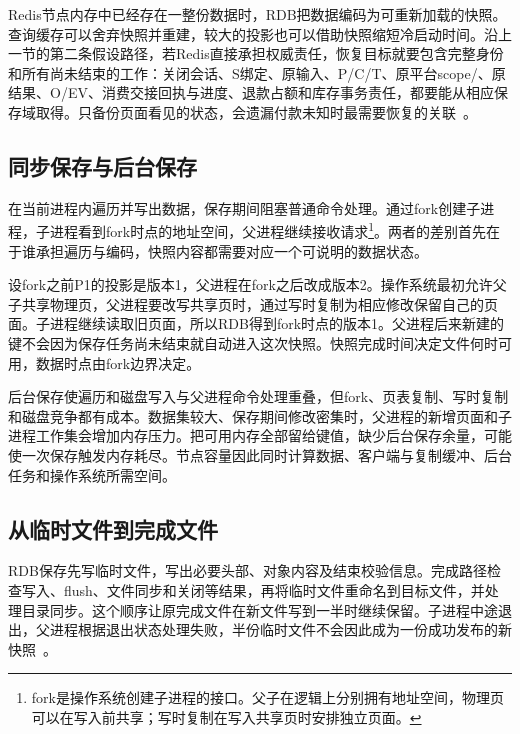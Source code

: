 Redis节点内存中已经存在一整份数据时，RDB把数据编码为可重新加载的快照。查询缓存可以舍弃快照并重建，较大的投影也可以借助快照缩短冷启动时间。沿上一节的第二条假设路径，若Redis直接承担权威责任，恢复目标就要包含完整身份和所有尚未结束的工作：关闭会话、S绑定、原输入、P/C/T、原平台scope/、原结果、O/EV、消费交接回执与进度、退款占额和库存事务责任，都要能从相应保存域取得。只备份页面看见的状态，会遗漏付款未知时最需要恢复的关联~\cite{redis8102-persistence}。

\subsection{同步保存与后台保存}

在当前进程内遍历并写出数据，保存期间阻塞普通命令处理。通过fork创建子进程，子进程看到fork时点的地址空间，父进程继续接收请求\footnote{fork是操作系统创建子进程的接口。父子在逻辑上分别拥有地址空间，物理页可以在写入前共享；写时复制在写入共享页时安排独立页面。}。两者的差别首先在于谁承担遍历与编码，快照内容都需要对应一个可说明的数据状态。

设fork之前P1的投影是版本1，父进程在fork之后改成版本2。操作系统最初允许父子共享物理页，父进程要改写共享页时，通过写时复制为相应修改保留自己的页面。子进程继续读取旧页面，所以RDB得到fork时点的版本1。父进程后来新建的键不会因为保存任务尚未结束就自动进入这次快照。快照完成时间决定文件何时可用，数据时点由fork边界决定。


后台保存使遍历和磁盘写入与父进程命令处理重叠，但fork、页表复制、写时复制和磁盘竞争都有成本。数据集较大、保存期间修改密集时，父进程的新增页面和子进程工作集会增加内存压力。把可用内存全部留给键值，缺少后台保存余量，可能使一次保存触发内存耗尽。节点容量因此同时计算数据、客户端与复制缓冲、后台任务和操作系统所需空间。

\subsection{从临时文件到完成文件}

RDB保存先写临时文件，写出必要头部、对象内容及结束校验信息。完成路径检查写入、flush、文件同步和关闭等结果，再将临时文件重命名到目标文件，并处理目录同步。这个顺序让原完成文件在新文件写到一半时继续保留。子进程中途退出，父进程根据退出状态处理失败，半份临时文件不会因此成为一份成功发布的新快照~\cite{redis8102-source}。


